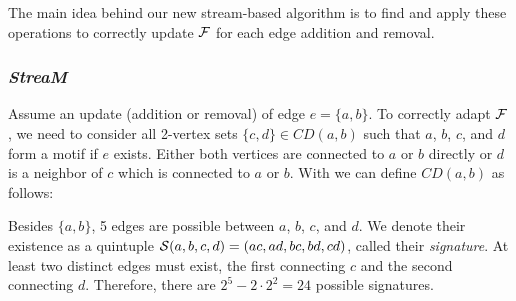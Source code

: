 \documentclass{article}
\begin{document}
The main idea behind our new stream-based algorithm is to find and apply these operations to correctly update ${\cal F}$ for each edge addition and removal.









\subsubsection{\emph{StreaM}}

Assume an update (addition or removal) of edge $e=\{a,b\}$.
To correctly adapt ${\cal F}$, we need to consider all 2-vertex sets $\{c,d\} \in CD(a,b)$ such that $a$, $b$, $c$, and $d$ form a motif if $e$ exists.
Either both vertices are connected to $a$ or $b$ directly or $d$ is a neighbor of $c$ which is connected to $a$ or $b$.
With  we can define $CD(a,b)$ as follows:

Besides $\{a,b\}$, 5 edges are possible between $a$, $b$, $c$, and $d$.
We denote their existence as a quintuple ${\cal S}(a,b,c,d) = (ac, ad, bc, bd, cd)$, called their \emph{signature}.
At least two distinct edges must exist, the first connecting $c$ and the second connecting $d$.
Therefore, there are $2^5 - 2 \cdot 2^2 = 24$ possible signatures.
\end{document}
